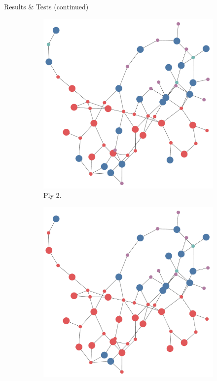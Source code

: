 \documentclass[final]{beamer} %
\begin{document}
\begin{frame}
\begin{columns}
\begin{column}{.35\textwidth}
{\begin{block}{Results \& Tests (continued)}
\begin{figure}[!htb]
\begin{subfigure}[!htb]{0.24\columnwidth}
							\includegraphics[width=\columnwidth]{figures/knn_forward_think_2.pdf}
							\caption{Ply 2.}
						\end{subfigure}
						\begin{subfigure}[!htb]{0.24\columnwidth}
							\centering
							\includegraphics[width=\columnwidth]{figures/knn_forward_think_3.pdf}

\end{subfigure}
\end{figure}
\end{block}}
\end{column}
\end{columns}
\end{frame}
\end{document}
